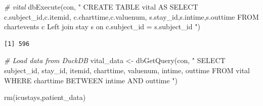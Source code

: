 \documentclass[
]{article}
\newenvironment{Shaded}{\begin{snugshade}}{\end{snugshade}}
\newcommand{\CommentTok}[1]{\textcolor[rgb]{0.56,0.35,0.01}{\textit{#1}}}
\newcommand{\FunctionTok}[1]{\textcolor[rgb]{0.00,0.00,0.00}{#1}}
\newcommand{\NormalTok}[1]{\textcolor[rgb]{0.00,0.00,0.00}{#1}}
\newcommand{\OtherTok}[1]{\textcolor[rgb]{0.56,0.35,0.01}{#1}}
\newcommand{\StringTok}[1]{\textcolor[rgb]{0.31,0.60,0.02}{#1}}
\begin{document}
\begin{Shaded}
\begin{Highlighting}[]
\CommentTok{\# vital}
\FunctionTok{dbExecute}\NormalTok{(con, }\StringTok{"}
\StringTok{  CREATE TABLE vital AS}
\StringTok{  SELECT c.subject\_id,c.itemid,}
\StringTok{  c.charttime,c.valuenum,}
\StringTok{  s.stay\_id,s.intime,s.outtime}
\StringTok{  FROM chartevents c}
\StringTok{  Left join stay s}
\StringTok{  on c.subject\_id = s.subject\_id}
\StringTok{"}\NormalTok{)}
\end{Highlighting}
\end{Shaded}

\begin{verbatim}
[1] 596
\end{verbatim}

\begin{Shaded}
\begin{Highlighting}[]
\CommentTok{\# Load data from DuckDB}
\NormalTok{vital\_data }\OtherTok{\textless{}{-}} \FunctionTok{dbGetQuery}\NormalTok{(con, }\StringTok{"}
\StringTok{  SELECT subject\_id, stay\_id, itemid, charttime,}
\StringTok{  valuenum, intime, outtime}
\StringTok{  FROM vital  }
\StringTok{  WHERE charttime BETWEEN intime AND outtime}
\StringTok{"}\NormalTok{)}

\FunctionTok{rm}\NormalTok{(icustays,patient\_data)}
\end{Highlighting}
\end{Shaded}
\end{document}
